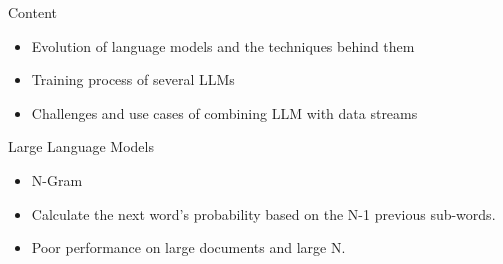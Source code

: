 \documentclass[t]{beamer}
\begin{document}
\begin{frame}{Content}
  \vspace{1cm}
  \begin{itemize}
    \item Evolution of language models and the techniques behind them
    \newline
    \item Training process of several LLMs
    \newline
    \item Challenges and use cases of combining LLM with data streams
  \end{itemize}
\end{frame}
\begin{frame}{Large Language Models}
  \vspace{3cm}
  \centering
\vspace{1cm}
\begin{itemize}
  \item N-Gram \cite{Cavnar94}
  \item Calculate the next word's probability based on the N-1 previous sub-words.
  \item Poor performance on large documents and large N.
\end{itemize}
\end{frame}
\end{document}
